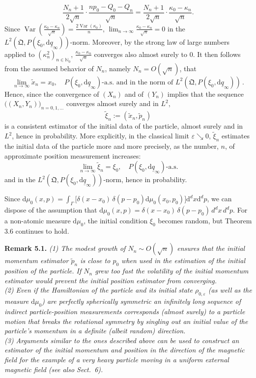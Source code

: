 \documentclass[12pt]{article}
\begin{document}
$$\frac{N_n+1}{2\sqrt{n}}\cdot \frac{np_0-Q_0-Q_n}{\sqrt{n}}=\frac{N_n+1}{2\sqrt{n}} \cdot \frac{\kappa_0-\kappa_n}{\sqrt{n}}.$$
Since $\operatorname{Var}(\frac{\kappa_0-\kappa_n}{\sqrt{n}})=\frac{2\operatorname{Var}(\kappa_0)}{n}$, 
$\lim_{n\to\infty}\frac{\kappa_0-\kappa_n}{\sqrt{n}}=0$ in the $L^2(\mathfrak{Q}, P(\xi_0,\text{d}\underline{q}_\infty))$-norm. 
Moreover, by the strong law of large numbers applied to $(\kappa_n^2)_{n\in \mathbb N_0}$, 
$\frac{\kappa_0-\kappa_n}{\sqrt{n}}$ converges also almost surely to $0$. It then follows from 
the assumed behavior of $N_n$, namely $N_n=O(\sqrt{n})$, that
$$\lim_{n\to\infty} \tilde x_n=x_0,\quad P(\xi_0,\text{d}\underline{q}_\infty)\mbox{-a.s. and in the norm of }
L^2(\mathfrak{Q}, P(\xi_0,\text{d}\underline{q}_\infty))\,.$$
Hence, since the convergence of $(X_n)$ and of $(Y_n)$ implies that the sequence 
$\big((X_n,Y_n)\big)_{n=0,1,\dots}$ converges almost surely and in $L^2$, 
$$\tilde\xi_n:=(\tilde x_n,\tilde p_n)$$
is a consistent estimator of the initial data of the particle, almost surely and in $L^2$, 
hence in probability. More explicitly, in the classical limit $\varepsilon\searrow 0$, $\tilde{\xi}_n$ estimates the 
initial data of the particle more and more precisely, as the number, $n$, of approximate position measurement increases:
$$\lim_{n\to\infty} \tilde \xi_n=\xi_0, \quad P(\xi_0,\text{d}\underline{q}_\infty)\mbox{-a.s.}$$
and in the $L^2(\mathfrak{Q}, P(\xi_0,\text{d}\underline{q}_\infty))$-norm, hence in probability.

Since $\text{d}\mu_0(x, p)=\int_\Gamma \big[\delta(x- x_0) \,\delta(p - p_0) \text{d}\mu_0(x_0, p_0)\big]\text{d}^dx\text{d}^dp$, we can dispose of the assumption that $\text{d}\mu_{0}(x, p)= \delta(x- x_0) \, \delta(p - p_0)\,d^{d}x \, d^{d}p.$
For a non-atomic measure $\text{d}\mu_0$, the initial condition $\xi_0$ becomes random, but Theorem 3.6 continues to hold. 

\medskip
\noindent
{\bf{Remark 5.1.}} \textit{(1) The modest growth of $N_n \sim O(\sqrt{n})$ ensures that the initial momentum estimator
$\tilde p_n$ is close to $p_0$ when used in the estimation of the initial position of the particle. If $N_n$ grew too fast the 
volatility of the initial momentum estimator would prevent the initial position estimator from converging.}\\
\textit{(2) Even if the Hamiltonian of the particle and its initial state $\rho_{0, \varepsilon}$ (as well as the measure 
$\text{d}\mu_0$) are perfectly spherically symmetric an infinitely long sequence of indirect particle-position measurements 
corresponds (almost surely) to a particle motion that breaks the rotational symmetry by singling out an initial value 
of the particle's momentum in a definite (albeit random) direction.}\\
\textit{(3) Arguments similar to the ones described above can be used to
construct an estimator of the initial momentum and position in the direction of the magnetic field 
for the example of a very heavy particle moving in a uniform external magnetic field (see also Sect.~6).}\\
\end{document}
